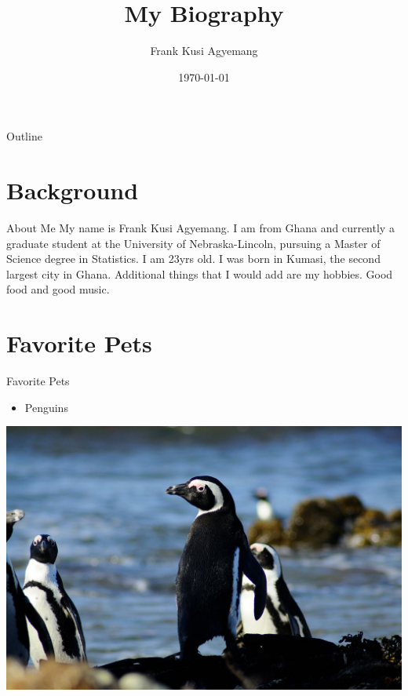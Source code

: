 \documentclass{beamer}\usepackage[]{graphicx}\usepackage[]{xcolor}
\title{My Biography}  %
\author{Frank Kusi Agyemang}                              %
\institute{University of Nebraska-Lincoln}                  %
\date{\today}                                    %
\begin{document}


\begin{frame}
  \titlepage 
\end{frame}


\begin{frame}{Outline}
  \tableofcontents 
\end{frame}

\section{Background}

\begin{frame}{About Me}
	My name is Frank Kusi Agyemang. I am from Ghana and currently a graduate student at the University of Nebraska-Lincoln, pursuing a Master of Science degree in Statistics. I am 23yrs old. I was born in Kumasi, the second largest city in Ghana. Additional things that I would add are my hobbies. Good food and good music.
\end{frame}

\section{Favorite Pets}

\begin{frame}{Favorite Pets}
\begin{itemize}
        \item Penguins
	\end{itemize}
\includegraphics[scale=0.6]{penguin.png}
\end{frame}
\end{document}
